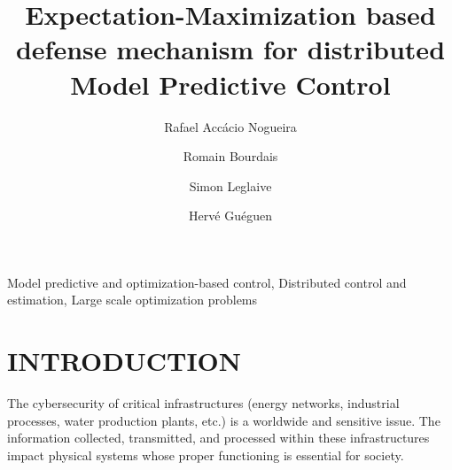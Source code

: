 \documentclass{ifacconf}  %
\begin{document}
\begin{frontmatter}
\title{\LARGE \bf
  Expectation-Maximization based defense mechanism for distributed Model Predictive Control
}

\author[First]{Rafael Accácio Nogueira}
\author[First]{Romain Bourdais}
\author[First]{Simon Leglaive}
\author[First]{Hervé Guéguen}
\address[First]{IETR-CentraleSupélec, 35510 Cesson-Sévigné, Ille-et-Vilaine, France\\
{\tt\small \{rafael-accacio.nogueira, romain.bourdais, simon.leglaive, herve.gueguen\}
@centralesupelec.fr}}




\begin{abstract}%
\end{abstract}

\begin{keyword}
  Model predictive and optimization-based control,
  Distributed control and estimation,
Large scale optimization problems
\end{keyword}

\end{frontmatter}

\section{INTRODUCTION}

The cybersecurity of critical infrastructures (energy networks, industrial
processes, water production plants, etc.) is a worldwide and sensitive
issue. The information collected, transmitted, and processed within these
infrastructures impact physical systems whose proper functioning is
essential for society.
\end{document}
